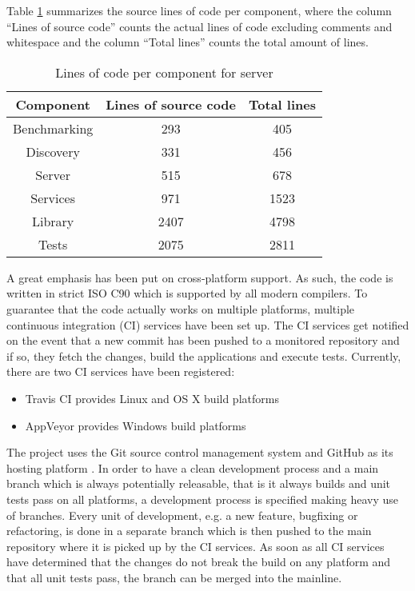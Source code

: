 Table \ref{tab:sloc} summarizes the source lines of code per component, where the column ``Lines of source code'' counts the actual lines of code excluding comments and whitespace and the column ``Total lines'' counts the total amount of lines.
\begin{table}
    \centering
    \begin{tabular}{|c|c|c|}
        \hline
        \bfseries Component & \bfseries Lines of source code & \bfseries Total lines\\
        \hline
        Benchmarking & 293 & 405\\
        \hline
        Discovery & 331 & 456\\
        \hline
        Server & 515 & 678\\
        \hline
        Services & 971 & 1523\\
        \hline
        Library & 2407 & 4798\\
        \hline
        Tests & 2075 & 2811 \\
        \hline
    \end{tabular}
    \caption{Lines of code per component for server}
    \label{tab:sloc}
\end{table}

A great emphasis has been put on cross-platform support.
As such, the code is written in strict ISO C90 \cite{iso-c90} which is supported by all modern compilers.
To guarantee that the code actually works on multiple platforms, multiple continuous integration (CI) services have been set up.
The CI services get notified on the event that a new commit has been pushed to a monitored repository and if so, they fetch the changes, build the applications and execute tests.
Currently, there are two CI services have been registered:
\begin{itemize}
    \item Travis CI \cite{travis} provides Linux and OS X build platforms
    \item AppVeyor \cite{appveyor} provides Windows build platforms
\end{itemize}

The project uses the Git source control management system \cite{git} and GitHub as its hosting platform \cite{github}.
In order to have a clean development process and a main branch which is always potentially releasable, that is it always builds and unit tests pass on all platforms, a development process is specified making heavy use of branches.
Every unit of development, e.g. a new feature, bugfixing or refactoring, is done in a separate branch which is then pushed to the main repository where it is picked up by the CI services.
As soon as all CI services have determined that the changes do not break the build on any platform and that all unit tests pass, the branch can be merged into the mainline.

